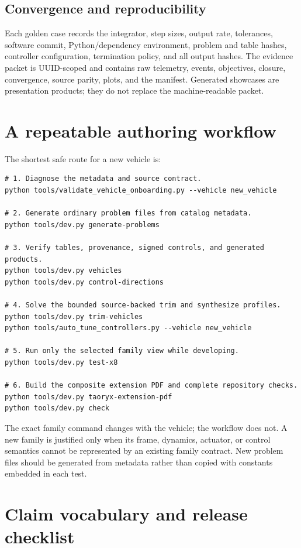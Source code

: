 \documentclass[11pt]{article}
\begin{document}
\subsection{Convergence and reproducibility}

Each golden case records the integrator, step sizes, output rate, tolerances,
software commit, Python/dependency environment, problem and table hashes,
controller configuration, termination policy, and all output hashes. The
evidence packet is UUID-scoped and contains raw telemetry, events, objectives,
closure, convergence, source parity, plots, and the manifest. Generated
showcases are presentation products; they do not replace the machine-readable
packet.

\section{A repeatable authoring workflow}

The shortest safe route for a new vehicle is:

\begin{lstlisting}
# 1. Diagnose the metadata and source contract.
python tools/validate_vehicle_onboarding.py --vehicle new_vehicle

# 2. Generate ordinary problem files from catalog metadata.
python tools/dev.py generate-problems

# 3. Verify tables, provenance, signed controls, and generated products.
python tools/dev.py vehicles
python tools/dev.py control-directions

# 4. Solve the bounded source-backed trim and synthesize profiles.
python tools/dev.py trim-vehicles
python tools/auto_tune_controllers.py --vehicle new_vehicle

# 5. Run only the selected family view while developing.
python tools/dev.py test-x8

# 6. Build the composite extension PDF and complete repository checks.
python tools/dev.py taoryx-extension-pdf
python tools/dev.py check
\end{lstlisting}

The exact family command changes with the vehicle; the workflow does not. A new
family is justified only when its frame, dynamics, actuator, or control
semantics cannot be represented by an existing family contract. New problem
files should be generated from metadata rather than copied with constants
embedded in each test.

\section{Claim vocabulary and release checklist}
\end{document}
